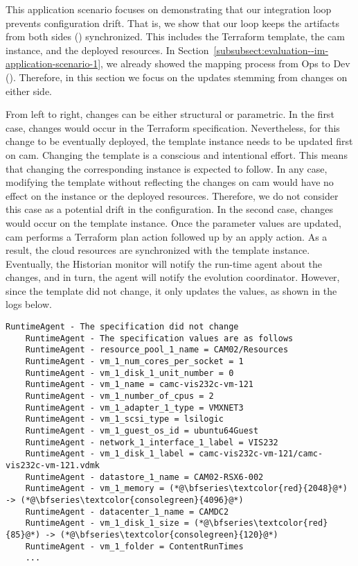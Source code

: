 This application scenario focuses on demonstrating that our integration loop prevents configuration drift. That is, we show that our loop keeps the artifacts from both sides () synchronized. This includes the Terraform template, the \gls{cam} instance, and the deployed resources. In Section~\ref{subsubsect:evaluation--im-application-scenario-1}, we already showed the mapping process from Ops to Dev (). Therefore, in this section we focus on the updates stemming from changes on either side.

From left to right, changes can be either structural or parametric. In the first case, changes would occur in the Terraform specification. Nevertheless, for this change to be eventually deployed, the template instance needs to be updated first on \gls{cam}. Changing the template is a conscious and intentional effort. This means that changing the corresponding instance is expected to follow. In any case, modifying the template without reflecting the changes on \gls{cam} would have no effect on the instance or the deployed resources. Therefore, we do not consider this case as a potential drift in the configuration. In the second case, changes would occur on the template instance. Once the parameter values are updated, \gls{cam} performs a Terraform plan action followed up by an apply action. As a result, the cloud resources are synchronized with the template instance. Eventually, the Historian monitor will notify the run-time agent about the changes, and in turn, the agent will notify the evolution coordinator. However, since the template did not change, it only updates the values, as shown in the logs below.

\begin{mdframed}[style=consolestyle]
	\vspace{0.3em}
	\begin{lstlisting}[style=console]
	RuntimeAgent - The specification did not change
	RuntimeAgent - The specification values are as follows
	RuntimeAgent - resource_pool_1_name = CAM02/Resources
	RuntimeAgent - vm_1_num_cores_per_socket = 1
	RuntimeAgent - vm_1_disk_1_unit_number = 0
	RuntimeAgent - vm_1_name = camc-vis232c-vm-121
	RuntimeAgent - vm_1_number_of_cpus = 2
	RuntimeAgent - vm_1_adapter_1_type = VMXNET3
	RuntimeAgent - vm_1_scsi_type = lsilogic
	RuntimeAgent - vm_1_guest_os_id = ubuntu64Guest
	RuntimeAgent - network_1_interface_1_label = VIS232
	RuntimeAgent - vm_1_disk_1_label = camc-vis232c-vm-121/camc-vis232c-vm-121.vdmk
	RuntimeAgent - datastore_1_name = CAM02-RSX6-002
	RuntimeAgent - vm_1_memory = (*@\bfseries\textcolor{red}{2048}@*) -> (*@\bfseries\textcolor{consolegreen}{4096}@*)
	RuntimeAgent - datacenter_1_name = CAMDC2
	RuntimeAgent - vm_1_disk_1_size = (*@\bfseries\textcolor{red}{85}@*) -> (*@\bfseries\textcolor{consolegreen}{120}@*)
	RuntimeAgent - vm_1_folder = ContentRunTimes
	...
	\end{lstlisting}
	\vspace{-0.3em}
\end{mdframed}

